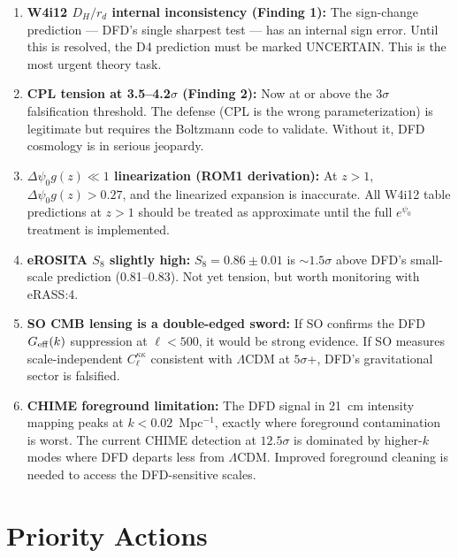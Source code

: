 \documentclass[11pt,a4paper]{article}
\newcommand{\LCDM}{$\Lambda$CDM}
\begin{document}
\begin{enumerate}

\item \textbf{W4i12 $D_H/r_d$ internal inconsistency (Finding 1):}
  The sign-change prediction --- DFD's single sharpest test --- has
  an internal sign error. Until this is resolved, the D4 prediction
  must be marked UNCERTAIN. This is the most urgent theory task.

\item \textbf{CPL tension at 3.5--4.2$\sigma$ (Finding 2):}
  Now at or above the $3\sigma$ falsification threshold. The defense
  (CPL is the wrong parameterization) is legitimate but requires
  the Boltzmann code to validate. Without it, DFD cosmology is
  in serious jeopardy.

\item \textbf{$\Delta\psi_0 g(z) \ll 1$ linearization (ROM1 derivation):}
  At $z > 1$, $\Delta\psi_0 g(z) > 0.27$, and the linearized expansion
  is inaccurate. All W4i12 table predictions at $z > 1$ should be
  treated as approximate until the full $e^{\psi_0}$ treatment is
  implemented.

\item \textbf{eROSITA $S_8$ slightly high:}
  $S_8 = 0.86 \pm 0.01$ is $\sim 1.5\sigma$ above DFD's small-scale
  prediction (0.81--0.83). Not yet tension, but worth monitoring with
  eRASS:4.

\item \textbf{SO CMB lensing is a double-edged sword:}
  If SO confirms the DFD $G_{\rm eff}(k)$ suppression at $\ell < 500$,
  it would be strong evidence. If SO measures scale-independent
  $C_\ell^{\kappa\kappa}$ consistent with \LCDM{} at $5\sigma$+, DFD's
  gravitational sector is falsified.

\item \textbf{CHIME foreground limitation:}
  The DFD signal in 21~cm intensity mapping peaks at $k < 0.02$~Mpc$^{-1}$,
  exactly where foreground contamination is worst. The current CHIME
  detection at $12.5\sigma$ is dominated by higher-$k$ modes where
  DFD departs less from \LCDM. Improved foreground cleaning is needed
  to access the DFD-sensitive scales.

\end{enumerate}

\section{Priority Actions}
\label{sec:actions}
\end{document}
